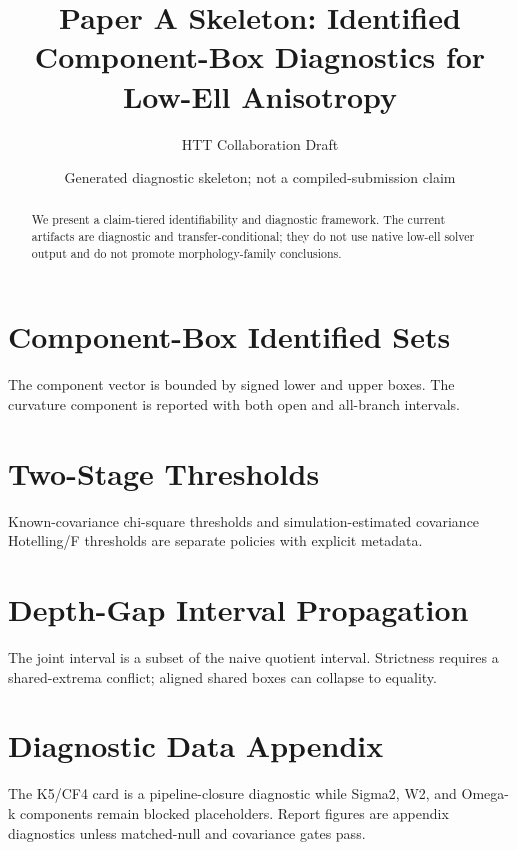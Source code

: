 \documentclass[11pt]{article}
\title{Paper A Skeleton: Identified Component-Box Diagnostics for Low-Ell Anisotropy}
\author{HTT Collaboration Draft}
\date{Generated diagnostic skeleton; not a compiled-submission claim}
\begin{document}
\maketitle

\begin{abstract}
We present a claim-tiered identifiability and diagnostic framework. The current
artifacts are diagnostic and transfer-conditional; they do not use native low-ell
solver output and do not promote morphology-family conclusions.
\end{abstract}

\section{Component-Box Identified Sets}
The component vector is bounded by signed lower and upper boxes. The curvature
component is reported with both open and all-branch intervals.

\section{Two-Stage Thresholds}
Known-covariance chi-square thresholds and simulation-estimated covariance
Hotelling/F thresholds are separate policies with explicit metadata.

\section{Depth-Gap Interval Propagation}
The joint interval is a subset of the naive quotient interval. Strictness requires
a shared-extrema conflict; aligned shared boxes can collapse to equality.

\section{Diagnostic Data Appendix}
The K5/CF4 card is a pipeline-closure diagnostic while Sigma2, W2, and Omega-k
components remain blocked placeholders. Report figures are appendix diagnostics
unless matched-null and covariance gates pass.
\end{document}
